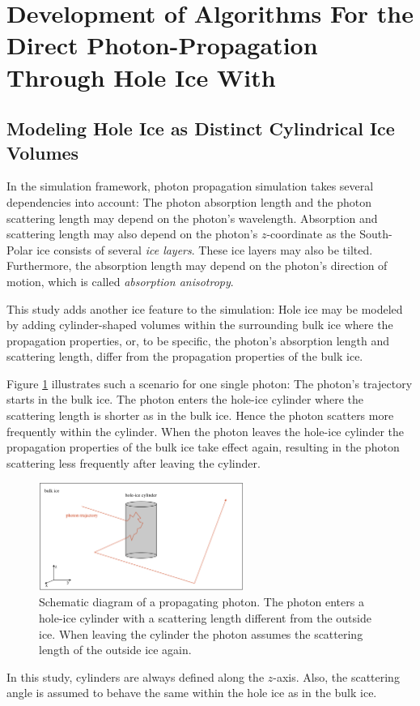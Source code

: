 \section{Development of Algorithms For the Direct Photon-Propagation Through Hole Ice With \clsim}
\label{sec:methods}

\renewcommand\currentsection{Hole-Ice Algorithms}

\subsection{Modeling Hole Ice as Distinct Cylindrical Ice Volumes}

In the \icecube simulation framework, photon propagation simulation
takes several dependencies into account: The photon absorption length
and the photon scattering length may depend on the photon's wavelength.
Absorption and scattering length may also depend on the photon's
\(z\)-coordinate as the South-Polar ice consists of several
\textit{ice layers}. These ice layers may also be tilted. Furthermore,
the absorption length may depend on the photon's direction of motion,
which is called \textit{absorption anisotropy}.

This study adds another ice feature to the simulation: Hole ice may be
modeled by adding cylinder-shaped volumes within the surrounding bulk
ice where the propagation properties, or, to be specific, the photon's
absorption length and scattering length, differ from the propagation
properties of the bulk ice.

Figure \ref{fig:aiw2Thah} illustrates such a scenario for one single
photon: The photon's trajectory starts in the bulk ice. The photon
enters the hole-ice cylinder where the scattering length is shorter as
in the bulk ice. Hence the photon scatters more frequently within the
cylinder. When the photon leaves the hole-ice cylinder the propagation
properties of the bulk ice take effect again, resulting in the photon
scattering less frequently after leaving the cylinder.

\begin{figure}[htb]
  \centering
  \includegraphics[width=0.6\textwidth]{img/hole-ice-as-cylinder-shaped-areas}
  \caption{Schematic diagram of a propagating photon. The photon enters a hole-ice cylinder with a scattering length different from the outside ice. When leaving the cylinder the photon assumes the scattering length of the outside ice again.}
  \label{fig:aiw2Thah}
\end{figure}

In this study, cylinders are always defined along the \(z\)-axis. Also,
the scattering angle is assumed to behave the same within the hole ice
as in the bulk ice.
